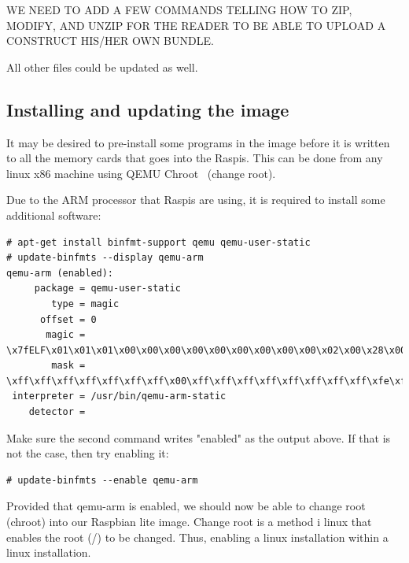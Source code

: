 WE NEED TO ADD A FEW COMMANDS TELLING HOW TO ZIP, MODIFY, AND UNZIP
FOR THE READER TO BE ABLE TO UPLOAD A CONSTRUCT HIS/HER OWN BUNDLE.

All other files could be updated as well.

\subsection{Installing and updating the image}

It may be desired to pre-install some programs in the image before it is
written to all the memory cards that goes into the \ac{Raspi}s.
This can be done from any linux x86 machine using QEMU Chroot~\cite{QemuUserEmulation}
(change root).

Due to the \ac{ARM} processor that \ac{Raspi}s are using, it is required to
install some additional software:

\begin{lstlisting}[]
# apt-get install binfmt-support qemu qemu-user-static
# update-binfmts --display qemu-arm
qemu-arm (enabled):
     package = qemu-user-static
        type = magic
      offset = 0
       magic = \x7fELF\x01\x01\x01\x00\x00\x00\x00\x00\x00\x00\x00\x00\x02\x00\x28\x00
        mask = \xff\xff\xff\xff\xff\xff\xff\x00\xff\xff\xff\xff\xff\xff\xff\xff\xfe\xff\xff\xff
 interpreter = /usr/bin/qemu-arm-static
    detector = 
\end{lstlisting}
\FloatBarrier
\vspace{-5mm}

Make sure the second command writes "enabled" as the output above. If that 
is not the case, then try enabling it:

\begin{lstlisting}[]
# update-binfmts --enable qemu-arm
\end{lstlisting}
\FloatBarrier
\vspace{-5mm}

Provided that qemu-arm is enabled, we should now be able to change root (chroot)
into our Raspbian lite image. Change root is a method i linux that enables
the root (/) to be changed. Thus, enabling a linux installation within a
linux installation.

